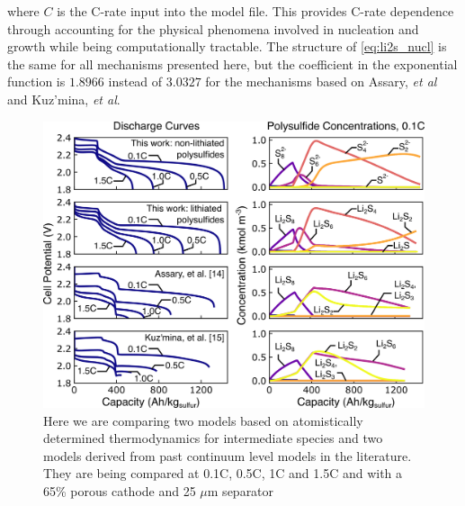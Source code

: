 \documentclass{elsarticle}
\begin{document}
where $C$ is the C-rate input into the model file. This provides C-rate dependence through accounting for the physical phenomena involved in nucleation and growth while being computationally tractable. The structure of \ref{eq:li2s_nucl} is the same for all mechanisms presented here, but the coefficient in the exponential function is $1.8966$ instead of $3.0327$ for the mechanisms based on Assary, \textit{et al} and Kuz'mina, \textit{et al}. 

\begin{figure}[t]
    \includegraphics[width=\textwidth]{Figures/Figure4_Mechanism_Comparison.png}
    \caption{Here we are comparing two models based on atomistically determined thermodynamics for intermediate species and two models derived from past continuum level models in the literature. They are being compared at 0.1C, 0.5C, 1C and 1.5C and with a 65\% porous cathode and 25 $\mu$m separator}
    \label{fig:mechanismcomparisonvoltage}
\end{figure}
\end{document}
